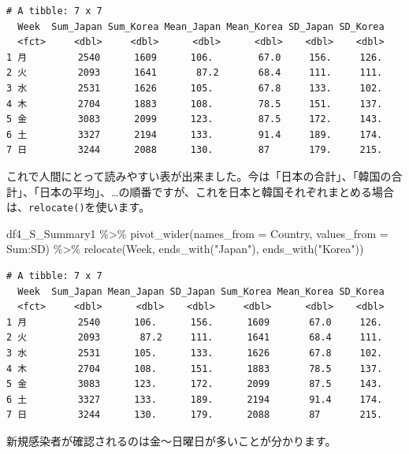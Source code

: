 \documentclass[
  a4paper,
  pandoc,
  ja=standard,
  jafont=haranoaji]{bxjsbook}
\newenvironment{Shaded}{\begin{snugshade}}{\end{snugshade}}
\newcommand{\AttributeTok}[1]{\textcolor[rgb]{0.00,0.48,0.65}{#1}}
\newcommand{\FunctionTok}[1]{\textcolor[rgb]{0.28,0.35,0.67}{#1}}
\newcommand{\NormalTok}[1]{\textcolor[rgb]{0.00,0.48,0.65}{#1}}
\newcommand{\SpecialCharTok}[1]{\textcolor[rgb]{0.37,0.37,0.37}{#1}}
\newcommand{\StringTok}[1]{\textcolor[rgb]{0.13,0.47,0.30}{#1}}
\begin{document}
\begin{verbatim}
# A tibble: 7 x 7
  Week  Sum_Japan Sum_Korea Mean_Japan Mean_Korea SD_Japan SD_Korea
  <fct>     <dbl>     <dbl>      <dbl>      <dbl>    <dbl>    <dbl>
1 月         2540      1609      106.        67.0     156.     126.
2 火         2093      1641       87.2       68.4     111.     111.
3 水         2531      1626      105.        67.8     133.     102.
4 木         2704      1883      108.        78.5     151.     137.
5 金         3083      2099      123.        87.5     172.     143.
6 土         3327      2194      133.        91.4     189.     174.
7 日         3244      2088      130.        87       179.     215.
\end{verbatim}

これで人間にとって読みやすい表が出来ました。今は「日本の合計」、「韓国の合計」、「日本の平均」、\ldots の順番ですが、これを日本と韓国それぞれまとめる場合は、\texttt{relocate()}を使います。

\begin{Shaded}
\begin{Highlighting}[numbers=left,,]
\NormalTok{df4\_S\_Summary1 }\SpecialCharTok{\%\textgreater{}\%}
  \FunctionTok{pivot\_wider}\NormalTok{(}\AttributeTok{names\_from  =}\NormalTok{ Country,}
              \AttributeTok{values\_from =}\NormalTok{ Sum}\SpecialCharTok{:}\NormalTok{SD) }\SpecialCharTok{\%\textgreater{}\%}
  \FunctionTok{relocate}\NormalTok{(Week, }\FunctionTok{ends\_with}\NormalTok{(}\StringTok{"Japan"}\NormalTok{), }\FunctionTok{ends\_with}\NormalTok{(}\StringTok{"Korea"}\NormalTok{))}
\end{Highlighting}
\end{Shaded}

\begin{verbatim}
# A tibble: 7 x 7
  Week  Sum_Japan Mean_Japan SD_Japan Sum_Korea Mean_Korea SD_Korea
  <fct>     <dbl>      <dbl>    <dbl>     <dbl>      <dbl>    <dbl>
1 月         2540      106.      156.      1609       67.0     126.
2 火         2093       87.2     111.      1641       68.4     111.
3 水         2531      105.      133.      1626       67.8     102.
4 木         2704      108.      151.      1883       78.5     137.
5 金         3083      123.      172.      2099       87.5     143.
6 土         3327      133.      189.      2194       91.4     174.
7 日         3244      130.      179.      2088       87       215.
\end{verbatim}

新規感染者が確認されるのは金〜日曜日が多いことが分かります。
\end{document}
